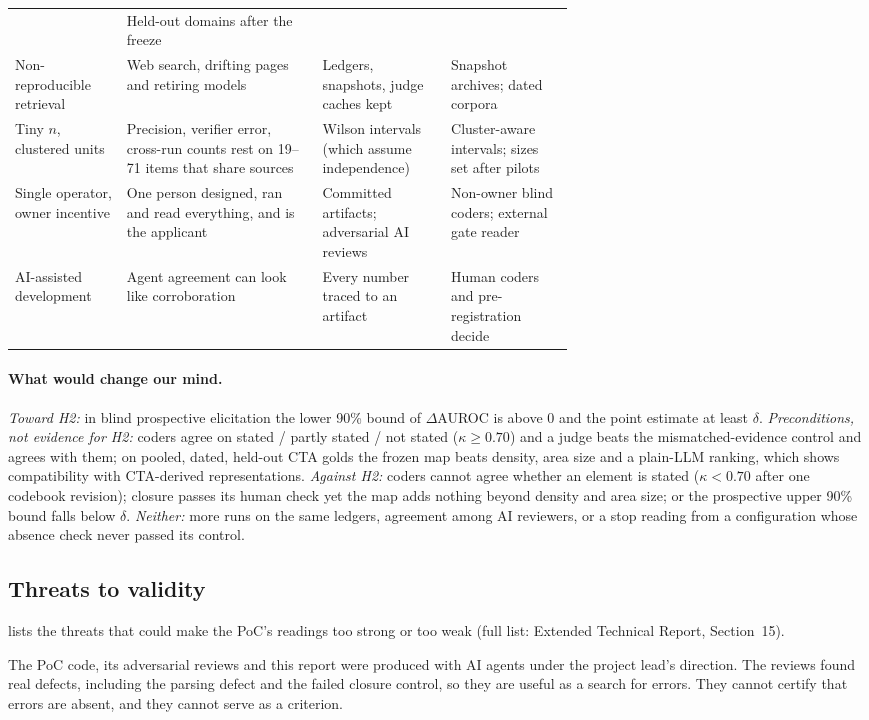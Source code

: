 \begin{table}[tbp]
\begin{tabularx}{\linewidth}{@{}>{\raggedright\arraybackslash}p{0.2\linewidth}
      >{\raggedright\arraybackslash}X>{\raggedright\arraybackslash}p{0.23\linewidth}
      >{\raggedright\arraybackslash}p{0.22\linewidth}@{}}
      & Held-out domains after the freeze \\
    Non-reproducible retrieval & Web search, drifting pages and retiring models & Ledgers, snapshots,
      judge caches kept & Snapshot archives; dated corpora \\
    Tiny $n$, clustered units & Precision, verifier error, cross-run counts rest on 19--71 items that
      share sources & Wilson intervals (which assume independence) & Cluster-aware intervals; sizes set
      after pilots \\
    Single operator, owner incentive & One person designed, ran and read everything, and is the
      applicant & Committed artifacts; adversarial AI reviews & Non-owner blind coders; external gate
      reader \\
    AI-assisted development & Agent agreement can look like corroboration & Every number traced to an
      artifact & Human coders and pre-registration decide \\
    \bottomrule
  \end{tabularx}
\end{table}

\paragraph{What would change our mind.} \emph{Toward H2:} in blind prospective elicitation the lower
90\% bound of $\Delta$AUROC is above 0 and the point estimate at least $\delta$. \emph{Preconditions, not
evidence for H2:} coders agree on stated / partly stated / not stated ($\kappa \geq 0.70$) and a judge
beats the mismatched-evidence control and agrees with them; on pooled, dated, held-out CTA golds the
frozen map beats density, area size and a plain-LLM ranking, which shows compatibility with CTA-derived
representations. \emph{Against H2:} coders cannot agree whether an element is stated ($\kappa < 0.70$ after one
codebook revision); closure passes its human check yet the map adds nothing beyond density and area
size; or the prospective upper 90\% bound falls below $\delta$. \emph{Neither:} more runs on the same
ledgers, agreement among AI reviewers, or a stop reading from a configuration whose absence check never
passed its control.

\subsection{Threats to validity}

 lists the threats that could make the PoC's readings too strong or too weak (full
list: Extended Technical Report, Section~15).


\evint{} The PoC code, its adversarial reviews and this report were produced with AI agents under the
project lead's direction. The reviews found real defects, including the parsing defect and the failed
closure control, so they are useful as a search for errors. They cannot certify that errors are absent,
and they cannot serve as a criterion.
